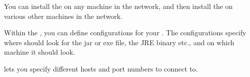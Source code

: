 You can install the \ite{}  on any machine in the network, and then install the \gdagent on various other machines in the network. 

Within the \ite{}, you can define configurations for your \gdaut{}. The configurations specify where \app{} should look for the \gdaut{} jar or exe file, the JRE binary etc., and on which machine it should look.

\app{} lets you specify different \gdagent{} hosts and port numbers to connect to. 

